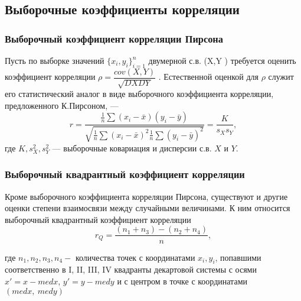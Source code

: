 \subsection{Выборочные коэффициенты корреляции}
\subsubsection{Выборочный коэффициент корреляции Пирсона}
\noindent Пусть по выборке значений $\{x_{i},y_{i}\}^{n}_{i=1}$ двумерной с.в. (X,Y ) требуется оценить коэффициент корреляции $\rho = \dfrac{cov(X,Y)}{\sqrt{DXDY}}$ . Естественной оценкой для $\rho$ служит его статистический аналог в виде выборочного коэффициента корреляции, предложенного К.Пирсоном, —
\begin{equation}
	r = \frac{
		\frac{1}{n}\sum{(x_{i} - \bar{x})(y_{i}-\bar{y})}
	}{
		\sqrt{\frac{1}{n}\sum{(x_{i} - \bar{x})^{2}}\frac{1}{n}\sum{(y_{i} - \bar{y})^{2}}}
	}=\frac{K}{s_{X}s_{Y}},
	\label{r}
\end{equation}
где $K,s^{2}_{X},s^{2}_{Y}$ — выборочные ковариация и дисперсии с.в. $X$ и $Y$.


\subsubsection{Выборочный квадрантный коэффициент корреляции}
\noindent Кроме выборочного коэффициента корреляции Пирсона, существуют и другие оценки степени взаимосвязи между случайными величинами. К ним относится выборочный квадрантный коэффициент корреляции
\begin{equation}
	r_{Q} = \frac{(n_{1} + n_{3}) - (n_{2} + n_{4})}{n},
	\label{rQ}
\end{equation}

\noindent где $n_1, n_2, n_3, n_4 - $ количества точек с координатами $x_i, y_i$, попавшими соответственно в I, II, III, IV квадранты декартовой системы с осями $x'=x-med x$, $y'=y-med y$ и с центром в точке с координатами $(med x,~med y)$




